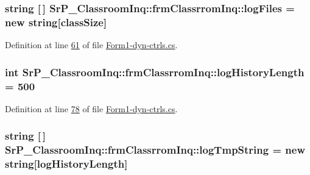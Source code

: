 \hypertarget{class_sr_p___classroom_inq_1_1frm_classrrom_inq_a1b23b6935997df29f1b06ed831495076}{
\subsubsection[{log\-Files}]{\setlength{\rightskip}{0pt plus 5cm}string \mbox{[}$\,$\mbox{]} {\bf \-Sr\-P\-\_\-\-Classroom\-Inq\-::frm\-Classrrom\-Inq\-::log\-Files} = new string\mbox{[}{\bf class\-Size}\mbox{]}}}
\label{class_sr_p___classroom_inq_1_1frm_classrrom_inq_a1b23b6935997df29f1b06ed831495076}


\-Definition at line \hyperlink{_form1-dyn-ctrls_8cs_source_l00061}{61} of file \hyperlink{_form1-dyn-ctrls_8cs_source}{\-Form1-\/dyn-\/ctrls.\-cs}.

\hypertarget{class_sr_p___classroom_inq_1_1frm_classrrom_inq_a0b55eb955abb243808249457ac92ca93}{
\subsubsection[{log\-History\-Length}]{\setlength{\rightskip}{0pt plus 5cm}int {\bf \-Sr\-P\-\_\-\-Classroom\-Inq\-::frm\-Classrrom\-Inq\-::log\-History\-Length} = 500}}
\label{class_sr_p___classroom_inq_1_1frm_classrrom_inq_a0b55eb955abb243808249457ac92ca93}


\-Definition at line \hyperlink{_form1-dyn-ctrls_8cs_source_l00078}{78} of file \hyperlink{_form1-dyn-ctrls_8cs_source}{\-Form1-\/dyn-\/ctrls.\-cs}.

\hypertarget{class_sr_p___classroom_inq_1_1frm_classrrom_inq_acf11c4997f1ad160ca28e4d7b1489f08}{
\subsubsection[{log\-Tmp\-String}]{\setlength{\rightskip}{0pt plus 5cm}string \mbox{[}$\,$\mbox{]} {\bf \-Sr\-P\-\_\-\-Classroom\-Inq\-::frm\-Classrrom\-Inq\-::log\-Tmp\-String} = new string\mbox{[}{\bf log\-History\-Length}\mbox{]}}}
\label{class_sr_p___classroom_inq_1_1frm_classrrom_inq_acf11c4997f1ad160ca28e4d7b1489f08}


